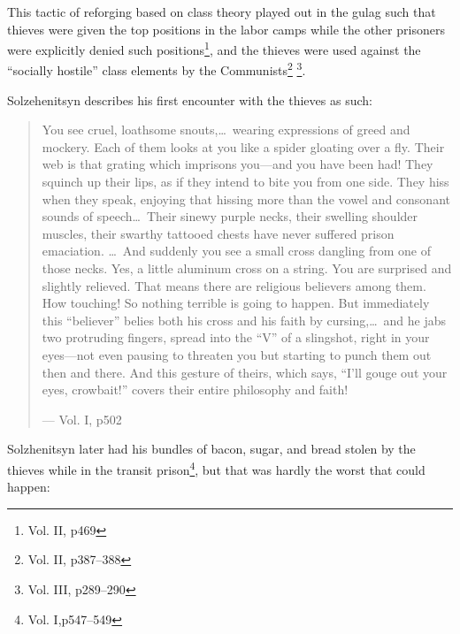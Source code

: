 \documentclass{article}
\begin{document}
This tactic of reforging based on class theory played out in the gulag such that thieves were given the top positions in the labor camps while the other prisoners were explicitly denied such positions\footnote{Vol. II, p469}, and the thieves were used against the ``socially hostile'' class elements by the Communists\footnote{Vol. II, p387--388} \footnote{Vol. III, p289--290}.

Solzehenitsyn describes his first encounter with the thieves as such:

\begin{quote}
You see cruel, loathsome snouts,\ldots~wearing expressions of greed and mockery.  Each of them looks at you like a spider gloating over a fly.  Their web is that grating which imprisons you---and you have been had!  They squinch up their lips, as if they intend to bite you from one side.  They hiss when they speak, enjoying that hissing more than the vowel and consonant sounds of speech\ldots~Their sinewy purple necks, their swelling shoulder muscles, their swarthy tattooed chests have never suffered prison emaciation.  \ldots~And suddenly you see a small cross dangling from one of those necks.  Yes, a little aluminum cross on a string.  You are surprised and slightly relieved.  That means there are religious believers among them.  How touching!  So nothing terrible is going to happen.  But immediately this ``believer'' belies both his cross and his faith by cursing,\ldots~and he jabs two protruding fingers, spread into the ``V'' of a slingshot, right in your eyes---not even pausing to threaten you but starting to punch them out then and there.  And this gesture of theirs, which says, ``I'll gouge out your eyes, crowbait!'' covers their entire philosophy and faith!

--- Vol. I, p502
\end{quote}

Solzhenitsyn later had his bundles of bacon, sugar, and bread stolen by the thieves while in the transit prison\footnote{Vol. I,p547--549}, but that was hardly the worst that could happen:
\end{document}
